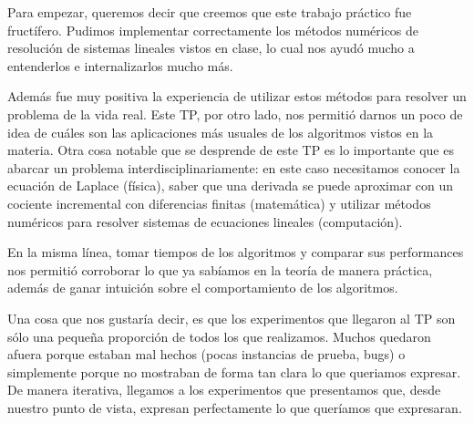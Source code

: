 Para empezar, queremos decir que creemos que este trabajo práctico fue fructífero. Pudimos implementar correctamente los métodos numéricos de resolución de sistemas lineales vistos en clase, lo cual nos ayudó mucho a entenderlos e internalizarlos mucho más.

Además fue muy positiva la experiencia de utilizar estos métodos para resolver un problema de la vida real. Este TP, por otro lado, nos permitió darnos un poco de idea de cuáles son las aplicaciones más usuales de los algoritmos vistos en la materia. Otra cosa notable que se desprende de este TP es lo importante que es abarcar un problema interdisciplinariamente: en este caso necesitamos conocer la ecuación de Laplace (física), saber que una derivada se puede aproximar con un cociente incremental con diferencias finitas (matemática) y utilizar métodos numéricos para resolver sistemas de ecuaciones lineales (computación).

En la misma línea, tomar tiempos de los algoritmos y comparar sus performances nos permitió corroborar lo que ya sabíamos en la teoría de manera práctica, además de ganar intuición sobre el comportamiento de los algoritmos.

Una cosa que nos gustaría decir, es que los experimentos que llegaron al TP son sólo una pequeña proporción de todos los que realizamos. Muchos quedaron afuera porque estaban mal hechos (pocas instancias de prueba, bugs) o simplemente porque no mostraban de forma tan clara lo que queriamos expresar. De manera iterativa, llegamos a los experimentos que presentamos que, desde nuestro punto de vista, expresan perfectamente lo que queríamos que expresaran.

